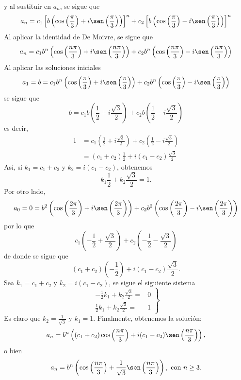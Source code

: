 \begin{myexample}
    y al sustituir en $a_n$, se sigue que
    $$a_n = c_1 \left[ b \left( \cos \left( \frac{\pi}{3} \right) + i \sen \left( \frac{\pi}{3} \right) \right) \right]^{n} + c_2 \left[ b \left( \cos \left( \frac{\pi}{3} \right) - i \sen \left( \frac{\pi}{3} \right) \right) \right]^{n}$$
    Al aplicar la identidad de De Moivre, se sigue que
    $$a_n = c_1 b^{n} \left( \cos \left( \frac{n\pi}{3} \right) + i \sen \left( \frac{n\pi}{3} \right) \right) + c_2 b^{n} \left( \cos \left( \frac{n\pi}{3} \right) - i \sen \left( \frac{n\pi}{3} \right) \right)$$
    Al aplicar las soluciones iniciales
    $$a_1 = b = c_1 b^{n} \left( \cos \left( \frac{\pi}{3} \right) + i \sen \left( \frac{\pi}{3} \right) \right) + c_2 b^{n} \left( \cos \left( \frac{\pi}{3} \right) - i \sen \left( \frac{\pi}{3} \right) \right)$$
    se sigue que
    $$b = c_1 b \left( \frac{1}{2} + i \frac{\sqrt{3}}{2} \right) + c_2 b \left( \frac{1}{2} - i \frac{\sqrt{3}}{2} \right)$$
    es decir,
    \begin{align*}
        1 & = c_1 \left( \frac{1}{2} + i \frac{\sqrt{3}}{2} \right) + c_2 \left( \frac{1}{2} - i \frac{\sqrt{3}}{2} \right) \\
        & = (c_1 + c_2) \frac{1}{2} + i (c_1 - c_2) \frac{\sqrt{3}}{2}
    \end{align*}
    Así, si $k_1 = c_1 + c_2$ y $k_2 = i(c_1 - c_2)$, obtenemos
    $$k_1 \frac{1}{2} + k_2 \frac{\sqrt{3}}{2} = 1.$$
    Por otro lado,
    $$a_0 = 0 = b^{2} \left( \cos \left( \frac{2\pi}{3} \right) + i \sen \left( \frac{2\pi}{3} \right) \right) + c_2 b^{2} \left( \cos \left( \frac{2\pi}{3} \right) - i \sen \left( \frac{2\pi}{3} \right) \right)$$
    por lo que
    $$c_1 \left( - \frac{1}{2} + \frac{\sqrt{3}}{2} \right) + c_2 \left( - \frac{1}{2} - \frac{\sqrt{3}}{2} \right)$$
    de donde se sigue que
    $$(c_1 + c_2) \left( - \frac{1}{2} \right) + i (c_1 - c_2) \frac{\sqrt{3}}{2}.$$
    Sea $k_1 = c_1 + c_2$ y $k_2 = i(c_1 - c_2)$, se sigue el siguiente sistema
    $$\left. \begin{array}{rl}
        \displaystyle - \frac{1}{2} k_1 + k_2 \frac{\sqrt{3}}{2} = & \!\!\!\! 0 \\[2mm]
        \displaystyle \frac{1}{2}k_1 + k_2 \frac{\sqrt{3}}{2} = & \!\!\!\! 1
    \end{array} \right\}$$
    Es claro que $\displaystyle k_2 = \frac{1}{\sqrt{3}}$ y $k_1 = 1$. Finalmente, obtenemos la solución:
    $$a_n = b^{n} \left( (c_1 + c_2) \cos \left( \frac{n\pi}{3} \right) + i(c_1 - c_2) \sen \left( \frac{n\pi}{3} \right) \right),$$
    o bien
    $$a_n = b^{n} \left( \cos \left( \frac{n\pi}{3} \right) + \frac{1}{\sqrt{3}} \sen \left( \frac{n\pi}{3} \right) \right), \text{ con } n \geq 3.$$
\end{myexample}

